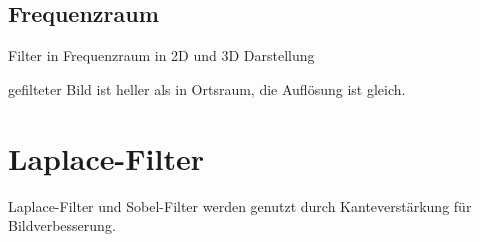 \documentclass[12pt]{article}
\begin{document}
\subsection{Frequenzraum}
Filter in Frequenzraum in 2D und 3D Darstellung
\begin{figure}[ht]\centering
\end{figure}
\newline
gefilteter Bild ist heller als in Ortsraum, die Auflösung ist gleich.
\begin{figure}[ht]\centering
\end{figure}
\newpage
\section{Laplace-Filter}
Laplace-Filter und Sobel-Filter werden genutzt durch Kanteverstärkung für Bildverbesserung.
\end{document}
